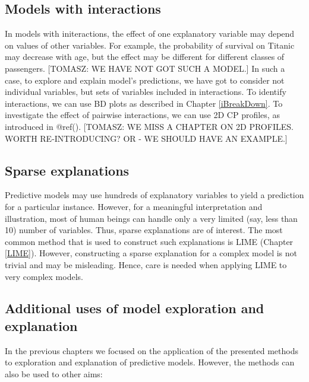 \documentclass[12pt,]{krantz}
\begin{document}
\hypertarget{models-with-interactions}{%
\subsection{Models with interactions}\label{models-with-interactions}}

In models with initeractions, the effect of one explanatory variable may depend on values of other variables. For example, the probability of survival on Titanic may decrease with age, but the effect may be different for different classes of passengers. {[}TOMASZ: WE HAVE NOT GOT SUCH A MODEL.{]} In such a case, to explore and explain model's predictions, we have got to consider not individual variables, but sets of variables included in interactions. To identify interactions, we can use BD plots as described in Chapter \ref{iBreakDown}. To investigate the effect of pairwise interactions, we can use 2D CP profiles, as introduced in @ref(). {[}TOMASZ: WE MISS A CHAPTER ON 2D PROFILES. WORTH RE-INTRODUCING? OR - WE SHOULD HAVE AN EXAMPLE.{]}

\hypertarget{sparse-explanations}{%
\subsection{Sparse explanations}\label{sparse-explanations}}

Predictive models may use hundreds of explanatory variables to yield a prediction for a particular instance. However, for a meaningful interpretation and illustration, most of human beings can handle only a very limited (say, less than 10) number of variables. Thus, sparse explanations are of interest. The most common method that is used to construct such explanations is LIME (Chapter \ref{LIME}). However, constructing a sparse explanation for a complex model is not trivial and may be misleading. Hence, care is needed when applying LIME to very complex models.

\hypertarget{additional-uses-of-model-exploration-and-explanation}{%
\subsection{Additional uses of model exploration and explanation}\label{additional-uses-of-model-exploration-and-explanation}}

In the previous chapters we focused on the application of the presented methods to exploration and explanation of predictive models. However, the methods can also be used to other aims:
\end{document}
